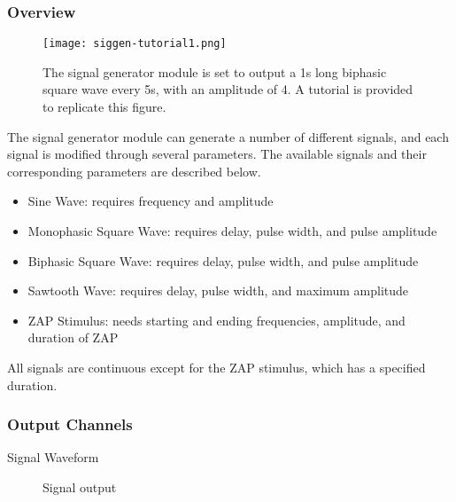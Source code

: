 
\subsubsection{Overview}
\label{Signal Generator}

\begin{figure}[h]
\begin{center}
\texttt{[image: siggen-tutorial1.png]} 
\caption[Signal Generator]{The signal generator module is set to output a 1s long biphasic square wave every 5s, with an amplitude of 4. A tutorial is provided to replicate this figure.}
\end{center}
\label{siggen1}
\end{figure}

The signal generator module can generate a number of different signals, and each signal is modified through several parameters. The available signals and their corresponding parameters are described below.

\begin{itemize}
\item Sine Wave: requires frequency and amplitude
\item Monophasic Square Wave: requires delay, pulse width, and pulse amplitude
\item Biphasic Square Wave: requires delay, pulse width, and pulse amplitude
\item Sawtooth Wave: requires delay, pulse width, and maximum amplitude
\item ZAP Stimulus: needs starting and ending frequencies, amplitude, and duration of ZAP
\end{itemize}

All signals are continuous except for the ZAP stimulus, which has a specified duration.

\subsubsection{Output Channels}
\begin{description}
\item [Signal Waveform]Signal output
\end{description}

